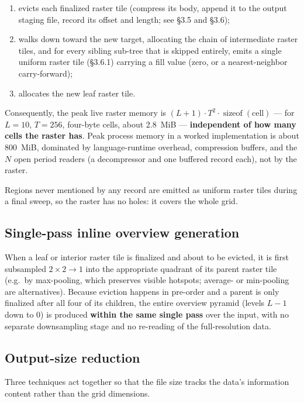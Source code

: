 \documentclass[10pt,twocolumn]{article}
\begin{document}
\begin{enumerate}
\item evicts each finalized raster tile (compress its body, append it to the
  output staging file, record its offset and length; see \S3.5 and \S3.6);
\item walks down toward the new target, allocating the chain of intermediate
  raster tiles, and for every sibling sub-tree that is skipped entirely, emits
  a single uniform raster tile (\S3.6.1) carrying a fill value (zero, or a
  nearest-neighbor carry-forward);
\item allocates the new leaf raster tile.
\end{enumerate}

Consequently, the peak live raster memory is
$(L + 1) \cdot T^{2} \cdot \operatorname{sizeof}(\text{cell})$ --- for
$L = 10$, $T = 256$, four-byte cells, about 2.8~MiB --- \textbf{independent of
how many cells the raster has}. Peak process memory in a worked implementation
is about 800~MiB, dominated by language-runtime overhead, compression buffers,
and the $N$ open period readers (a decompressor and one buffered record each),
not by the raster.

Regions never mentioned by any record are emitted as uniform raster tiles
during a final sweep, so the raster has no holes: it covers the whole grid.

\subsection{Single-pass inline overview generation}

When a leaf or interior raster tile is finalized and about to be evicted, it is
first subsampled $2 \times 2 \to 1$ into the appropriate quadrant of its parent
raster tile (e.g.\ by max-pooling, which preserves visible hotspots; average-
or min-pooling are alternatives). Because eviction happens in pre-order and a
parent is only finalized after all four of its children, the entire overview
pyramid (levels $L - 1$ down to $0$) is produced \textbf{within the same single
pass} over the input, with no separate downsampling stage and no re-reading of
the full-resolution data.

\subsection{Output-size reduction}

Three techniques act together so that the file size tracks the data's
information content rather than the grid dimensions.
\end{document}

